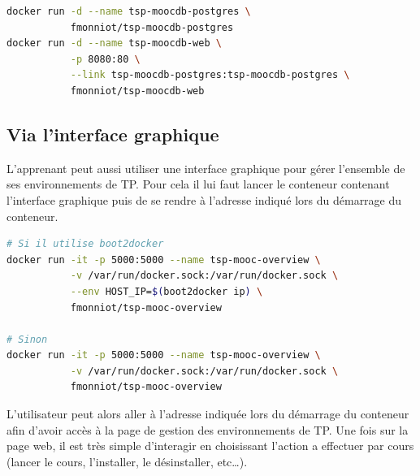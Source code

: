 \documentclass[a4paper,11pt]{report}
\begin{document}
\begin{lstlisting}[language=Bash,caption={Démarrer les conteneurs du MOOC de base de donnée}]
docker run -d --name tsp-moocdb-postgres \
           fmonniot/tsp-moocdb-postgres
docker run -d --name tsp-moocdb-web \
           -p 8080:80 \
           --link tsp-moocdb-postgres:tsp-moocdb-postgres \
           fmonniot/tsp-moocdb-web
\end{lstlisting}


\subsection{Via l'interface graphique}

L'apprenant peut aussi utiliser une interface graphique pour gérer l'ensemble de ses environnements de TP. Pour cela il lui faut lancer le conteneur contenant l'interface graphique puis de se rendre à l'adresse indiqué lors du démarrage du conteneur.

\begin{lstlisting}[language=Bash,caption={Démarrer le conteneur Overview}]
# Si il utilise boot2docker
docker run -it -p 5000:5000 --name tsp-mooc-overview \
           -v /var/run/docker.sock:/var/run/docker.sock \
           --env HOST_IP=$(boot2docker ip) \
           fmonniot/tsp-mooc-overview

# Sinon
docker run -it -p 5000:5000 --name tsp-mooc-overview \
           -v /var/run/docker.sock:/var/run/docker.sock \
           fmonniot/tsp-mooc-overview
\end{lstlisting}

L'utilisateur peut alors aller à l'adresse indiquée lors du démarrage du conteneur afin d'avoir accès à la page de gestion des environnements de TP.
Une fois sur la page web, il est très simple d'interagir en choisissant l'action a effectuer par cours (lancer le cours, l'installer, le désinstaller, etc…).
\thispagestyle{fancy}
\printbibliography
\thispagestyle{fancy}
\lstlistoflistings
\thispagestyle{fancy}
\listoffigures
\thispagestyle{fancy}
\end{document}
